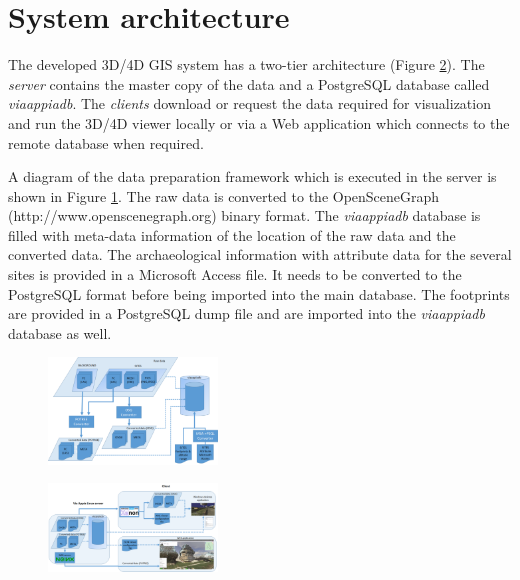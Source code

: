 \section{System architecture}

The developed 3D/4D GIS system has a two-tier architecture (Figure \ref{fig:sys_arch_2tier}). The {\em server} contains the master copy of the data and a PostgreSQL database called \textit{viaappiadb}. The {\em clients} download or request the data required for visualization and run the 3D/4D viewer locally or via a Web application which connects to the remote database when required.
 
A diagram of the data preparation framework which is executed in the server is shown in Figure \ref{fig:sys_arch_data_framework}. The raw data is converted to the OpenSceneGraph (http://www.openscenegraph.org) binary format. The \textit{viaappiadb} database is filled with meta-data information of the location of the raw data and the converted data. The archaeological information with attribute data for the several sites is provided in a Microsoft Access file. It needs to be converted to the PostgreSQL format before being imported into the main database. The footprints are provided in a PostgreSQL dump file and are imported into the \textit{viaappiadb} database as well.

\begin{figure}[!ht]
 \centering
 \includegraphics[width=0.4\textwidth]{fig/system_architecture/DataFramework.pdf}
 \caption{}
 \label{fig:sys_arch_data_framework}
\end{figure}

\begin{figure}[!ht]
 \centering
 \includegraphics[width=0.4\textwidth]{fig/system_architecture/TwoTierArchitecture.pdf}
 \caption{}
 \label{fig:sys_arch_2tier}
\end{figure}